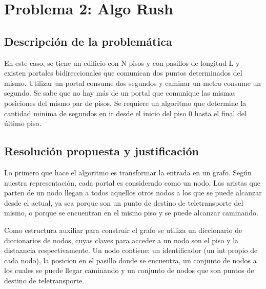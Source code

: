 \section{Problema 2: Algo Rush}

\subsection{Descripción de la problemática}
En este caso, se tiene un edificio con N pisos y con pasillos de longitud L y existen portales bidireccionales que comunican dos puntos determinados del mismo. Utilizar un portal consume dos segundos y caminar un metro consume un segundo. Se sabe que no hay más de un portal que comunique las mismas posiciones del mismo par de pisos.
Se requiere un algoritmo que determine la cantidad minima de segundos en ir desde el inicio del piso 0 hasta el final del último piso.

\subsection{Resolución propuesta y justificación}
Lo primero que hace el algoritmo es transformar la entrada en un grafo. Según nuestra representación, cada portal es considerado como un nodo. Las aristas que parten de un nodo llegan a todos aquellos otros nodos a los que se puede alcanzar desde el actual, ya sea porque son un punto de destino de teletransporte del mismo, o porque se encuentran en el mismo piso y se puede alcanzar caminando.

Como estructura auxiliar para construir el grafo se utiliza un diccionario de diccionarios de nodos, cuyas claves para acceder a un nodo son el piso y la distaancia respectivamente.
Un nodo contiene: un identificador (un int propio de cada nodo), la posicion en el pasillo donde se encuentra, un conjunto de nodos a los cuales se puede llegar caminando y un conjunto de nodos que son puntos de destino de teletransporte.

